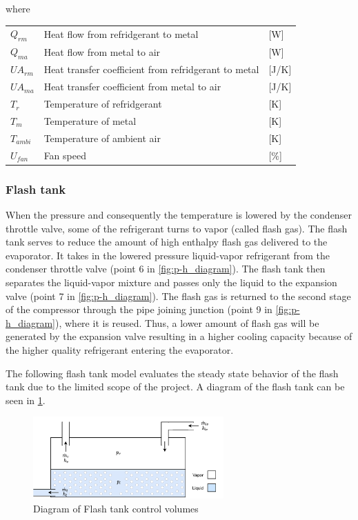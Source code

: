 where

\begin{center}
	\begin{tabular}{l p{8cm} l}
		$Q_{rm}$				&	Heat flow from refridgerant to metal					& [\si{W}] \\
		$Q_{ma}$				&	Heat flow from metal to air								& [\si{W}] \\
		$U A_{rm}$				& 	Heat transfer coefficient from refridgerant to metal 	& [\si{J}/\si{K}] \\
		$U A_{ma}$				& 	Heat transfer coefficient from metal to air				& [\si{J}/\si{K}] \\
		$T_r$					& 	Temperature of refridgerant 							& [\si{K}] \\
		$T_m$					&	Temperature of metal 									& [\si{K}] \\
		$T_{ambi}$				&	Temperature of ambient air 								& [\si{K}] \\
		$U_{fan}$				&	Fan speed												& [$\%$] \\
	\end{tabular}
\end{center}


\subsubsection{Flash tank}\label{sec:componentModel_flash-tank}
When the pressure and consequently the temperature is lowered by the condenser throttle valve, some of the refrigerant turns to vapor (called flash gas). The flash tank serves to reduce the amount of high enthalpy flash gas delivered to the evaporator. It takes in the lowered pressure liquid-vapor refrigerant from the condenser throttle valve (point 6 in \cref{fig:p-h_diagram}). The flash tank then separates the liquid-vapor mixture and passes only the liquid to the expansion valve (point 7 in \cref{fig:p-h_diagram}). The flash gas is returned to the second stage of the compressor through the pipe joining junction (point 9 in \cref{fig:p-h_diagram}), where it is reused. Thus, a lower amount of flash gas will be generated by the expansion valve resulting in a higher cooling capacity because of the higher quality refrigerant entering the evaporator.

The following flash tank model evaluates the steady state behavior of the flash tank due to the limited scope of the project. A diagram of the flash tank can be seen in \cref{fig:flash_tank_CV}.

\begin{figure}[h!]
	\centering
	\includegraphics[width=0.65\textwidth]{Graphics/Flash_tank.pdf}
	\caption{Diagram of Flash tank control volumes}
	\label{fig:flash_tank_CV}
\end{figure}

